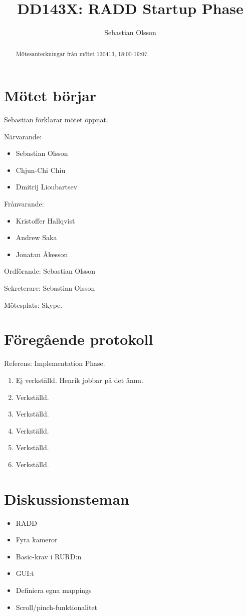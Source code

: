 \documentclass[a4paper,12pt]{article}
\author{Sebastian Olsson}
\title{DD143X: RADD Startup Phase}
\begin{document}
\maketitle
\begin{abstract}
    Mötesanteckningar från mötet 130413, 18:00-19:07.
\end{abstract}

\section{Mötet börjar}
Sebastian förklarar mötet öppnat.

Närvarande:
\begin{itemize}
\item Sebastian Olsson
\item Chjun-Chi Chiu
\item Dmitrij Lioubartsev
\end{itemize}
Frånvarande:
\begin{itemize}
\item Kristoffer Hallqvist
\item Andrew Saka
\item Jonatan Åkesson
\end{itemize}

Ordförande: Sebastian Olsson

Sekreterare: Sebastian Olsson

Mötesplats: Skype.

\section{Föregående protokoll}
Referens: Implementation Phase.

\begin{enumerate}
\item Ej verkställd. Henrik jobbar på det ännu.
\item Verkställd.
\item Verkställd.
\item Verkställd.
\item Verkställd.
\item Verkställd.
\end{enumerate}

\section{Diskussionsteman}
\begin{itemize}
\item RADD
\item Fyra kameror
\item Basic-krav i RURD:n
\item GUI:t
\item Definiera egna mappings
\item Scroll/pinch-funktionalitet
\end{itemize}
\end{document}
